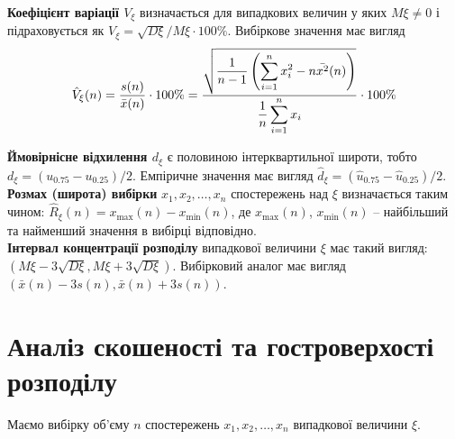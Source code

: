 \textbf{Коефіцієнт варіації $V_\xi$} визначається для випадкових величин у яких $M \xi \ne 0$ і підраховується як $V_\xi = \sqrt{D\xi} / M \xi \cdot 100\%$. Вибіркове значення має вигляд 
\[ \hat{V}_\xi(n) = \dfrac{s(n)}{\bar{x}(n)} \cdot 100\% = \dfrac{\sqrt{\dfrac{1}{n-1} \left(\displaystyle\sum\limits_{i=1}^n x_i^2 - n \bar{x^2}(n)\right)}}{\dfrac{1}{n} \displaystyle\sum\limits_{i=1}^n x_i} \cdot 100\% \]

\textbf{Ймовірнісне відхилення $d_\xi$} є половиною інтерквартильної широти, тобто $d_\xi = (u_{0.75} - u_{0.25}) / 2$. Емпіричне значення має вигляд $\hat{d}_\xi = (\hat{u}_{0.75} - \hat{u}_{0.25}) / 2$. \\

\textbf{Розмах (широта) вибірки} $x_1, x_2, \ldots, x_n$ спостережень над $\xi$ визначається таким чином: $\hat{R}_\xi(n) = x_{\max}(n) - x_{\min}(n)$, де $x_{\max}(n)$, $x_{\min}(n)$ -- найбільший та найменший значення в вибірці відповідно. \\

\textbf{Інтервал концентрації розподілу} випадкової величини $\xi$ має такий вигляд: $(M \xi - 3 \sqrt{D \xi}, M \xi + 3 \sqrt{D \xi})$. Вибірковий аналог має вигляд $(\bar{x}(n) - 3 s(n), \bar{x}(n) + 3 s(n))$.

\section{Аналіз скошеності та гостроверхості розподілу}

Маємо вибірку об'єму $n$ спостережень $x_1, x_2, \ldots, x_n$ випадкової величини $\xi$.


